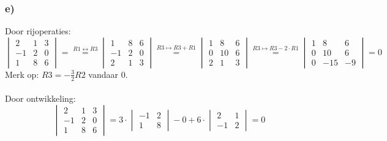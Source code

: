 \documentclass[lineaire_algebra_oplossingen.tex]{subfiles}
\begin{document}
\subsubsection*{e)}
Door rijoperaties:
$$
\begin{vmatrix}
2 & 1 & 3\\
-1 & 2 & 0\\
1 & 8 & 6
\end{vmatrix}
=
\overset{R1 \leftrightarrow R3}{=}
\begin{vmatrix}
1 & 8 & 6\\
-1 & 2 & 0\\
2 & 1 & 3
\end{vmatrix}
\overset{R3 \longmapsto R3 + R1}{=}
\begin{vmatrix}
1 & 8 & 6\\
0 & 10 & 6\\
2 & 1 & 3
\end{vmatrix}
\overset{R3 \longmapsto R3 - 2\cdot R1}{=}
\begin{vmatrix}
1 & 8 & 6\\
0 & 10 & 6\\
0 & -15 & -9
\end{vmatrix}
= 0
$$
Merk op: $R3 = -\frac{3}{2} R2$ vandaar $0$.\\
\\
Door ontwikkeling:
$$
\begin{vmatrix}
2 & 1 & 3\\
-1 & 2 & 0\\
1 & 8 & 6
\end{vmatrix}
=
3 \cdot
\begin{vmatrix}
-1 & 2\\
1 & 8
\end{vmatrix}
-0
+6 \cdot
\begin{vmatrix}
2 & 1\\
-1 & 2
\end{vmatrix}
= 0
$$
\end{document}
